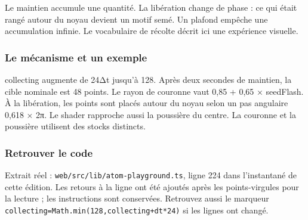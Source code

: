 \documentclass[
  canadien,
  11pt,
  letterpaper,
]{article}
\begin{document}
Le maintien accumule une quantité. La libération change de phase : ce
qui était rangé autour du noyau devient un motif semé. Un plafond
empêche une accumulation infinie. Le vocabulaire de récolte décrit ici
une expérience visuelle.

\subsubsection{Le mécanisme et un
exemple}\label{le-muxe9canisme-et-un-exemple-7}

collecting augmente de 24Δt jusqu'à 128. Après deux secondes de
maintien, la cible nominale est 48 points. Le rayon de couronne vaut
0,85 + 0,65 × seedFlash. À la libération, les points sont placés autour
du noyau selon un pas angulaire 0,618 × 2π. Le shader rapproche aussi la
poussière du centre. La couronne et la poussière utilisent des stocks
distincts.

\subsubsection{Retrouver le code}\label{retrouver-le-code-7}

Extrait réel : \texttt{web/src/lib/atom-playground.ts}, ligne 224 dans
l'instantané de cette édition. Les retours à la ligne ont été ajoutés
après les points-virgules pour la lecture ; les instructions sont
conservées. Retrouvez aussi le marqueur
\texttt{collecting=Math.min(128,collecting+dt*24)} si les lignes ont
changé.
\end{document}
